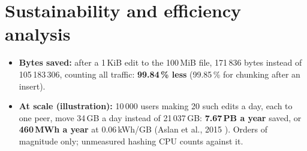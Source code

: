 \section{Sustainability and efficiency analysis}
\label{sec:sustainability}

\begin{itemize}[leftmargin=*,itemsep=1pt,topsep=2pt]
  \item \textbf{Bytes saved:} after a 1\,KiB edit to the 100\,MiB file, 171\,836 bytes instead of
  105\,183\,306, counting all traffic: \textbf{99.84\,\% less} (99.85\,\% for chunking after an insert).
  \item \textbf{At scale (illustration):} 10\,000 users making 20 such edits a day, each to one peer,
  move 34\,GB a day instead of 21\,037\,GB: \textbf{7.67\,PB a year} saved, or \textbf{460\,MWh a year} at
  0.06\,kWh/GB (Aslan et al., 2015 ). Orders of magnitude only; unmeasured hashing CPU counts against it.
\end{itemize}
